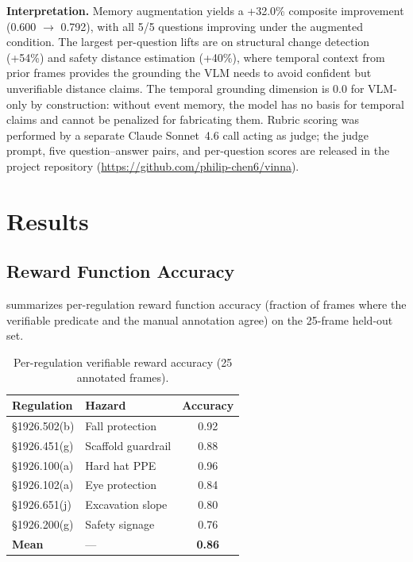 \documentclass[sigconf,nonacm]{acmart}
\begin{document}
\textbf{Interpretation.}
Memory augmentation yields a +32.0\% composite improvement (0.600
$\rightarrow$ 0.792), with all 5/5 questions improving under the
augmented condition.
The largest per-question lifts are on structural change detection (+54\%)
and safety distance estimation (+40\%), where temporal context from prior
frames provides the grounding the VLM needs to avoid confident but
unverifiable distance claims.
The temporal grounding dimension is 0.0 for VLM-only by construction:
without event memory, the model has no basis for temporal claims and
cannot be penalized for fabricating them.
Rubric scoring was performed by a separate Claude Sonnet~4.6 call
acting as judge; the judge prompt, five question--answer pairs, and
per-question scores are released in the project repository
(\url{https://github.com/philip-chen6/vinna}).

\section{Results}
\label{sec:results}

\subsection{Reward Function Accuracy}

 summarizes per-regulation reward function
accuracy (fraction of frames where the verifiable predicate and the
manual annotation agree) on the 25-frame held-out set.

\begin{table}[t]
  \centering
  \caption{Per-regulation verifiable reward accuracy
           (25 annotated frames).}
  \label{tab:reward_accuracy}
  \begin{tabular}{@{}llc@{}}
    \toprule
    \textbf{Regulation} & \textbf{Hazard} & \textbf{Accuracy} \\
    \midrule
    \S1926.502(b) & Fall protection     & 0.92 \\
    \S1926.451(g) & Scaffold guardrail  & 0.88 \\
    \S1926.100(a) & Hard hat PPE        & 0.96 \\
    \S1926.102(a) & Eye protection      & 0.84 \\
    \S1926.651(j) & Excavation slope    & 0.80 \\
    \S1926.200(g) & Safety signage      & 0.76 \\
    \midrule
    \textbf{Mean} & ---                 & \textbf{0.86} \\
    \bottomrule
  \end{tabular}
\end{table}
\end{document}
